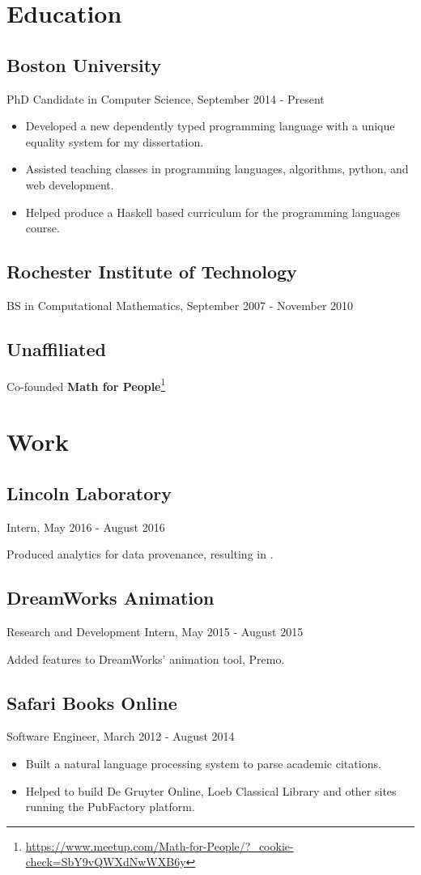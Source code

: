 \section*{Education}
\subsection*{Boston University}
PhD Candidate in Computer Science, September 2014 - Present
\begin{itemize}
  \item Developed a new dependently typed programming language with a unique equality system for my dissertation.
  \item Assisted teaching classes in programming languages, algorithms, python, and web development.
  \item Helped produce a Haskell based curriculum for the programming languages course.
\end{itemize}

\subsection*{Rochester Institute of Technology}
BS in Computational Mathematics, September 2007 - November 2010

\subsection*{Unaffiliated}
Co-founded \textbf{Math for People}\footnote{\url{https://www.meetup.com/Math-for-People/?_cookie-check=SbY9vQWXdNwWXB6y}}

\section*{Work}
\subsection*{Lincoln Laboratory}
Intern,	May 2016 - August 2016

Produced analytics for data provenance, resulting in \cite{lemay2017automated}.

\subsection*{DreamWorks Animation}
Research and Development Intern,	May 2015 - August 2015
 
Added features to DreamWorks’ animation tool, Premo.

\subsection*{Safari Books Online}
Software Engineer,	March 2012 - August 2014
\begin{itemize}
  \item Built a natural language processing system to parse academic citations.
  \item Helped to build De Gruyter Online, Loeb Classical Library and other sites running the PubFactory platform.
\end{itemize}
